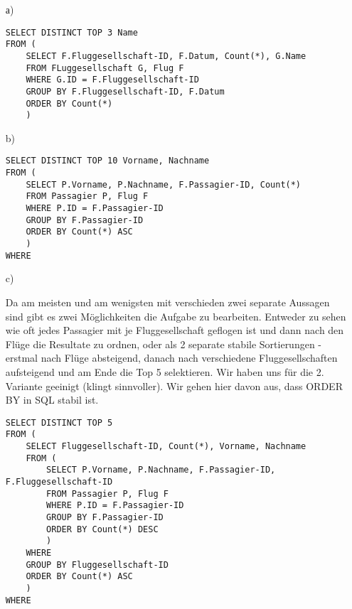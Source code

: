 \begin{itemize}

\item[а)]
\begin{Verbatim}
SELECT DISTINCT TOP 3 Name
FROM (
	SELECT F.Fluggesellschaft-ID, F.Datum, Count(*), G.Name
	FROM FLuggesellschaft G, Flug F
	WHERE G.ID = F.Fluggesellschaft-ID
	GROUP BY F.Fluggesellschaft-ID, F.Datum
	ORDER BY Count(*)
	)
\end{Verbatim}

\item[b)]
\begin{Verbatim}
SELECT DISTINCT TOP 10 Vorname, Nachname
FROM (
	SELECT P.Vorname, P.Nachname, F.Passagier-ID, Count(*)
	FROM Passagier P, Flug F
	WHERE P.ID = F.Passagier-ID
	GROUP BY F.Passagier-ID
	ORDER BY Count(*) ASC
	)
WHERE
\end{Verbatim}

\item[c)]

Da am meisten und am wenigsten mit verschieden zwei separate Aussagen sind gibt es zwei Möglichkeiten die Aufgabe zu bearbeiten. Entweder zu sehen wie oft jedes Passagier mit je Fluggesellschaft geflogen ist und dann nach den Flüge die Resultate zu ordnen, oder als 2 separate stabile Sortierungen - erstmal nach Flüge absteigend, danach nach verschiedene Fluggesellschaften aufsteigend und am Ende die Top 5 selektieren. Wir haben uns für die 2. Variante geeinigt (klingt sinnvoller). Wir gehen hier davon aus, dass ORDER BY in SQL stabil ist.

\begin{Verbatim}
SELECT DISTINCT TOP 5 
FROM (
	SELECT Fluggesellschaft-ID, Count(*), Vorname, Nachname
	FROM (
		SELECT P.Vorname, P.Nachname, F.Passagier-ID, F.Fluggesellschaft-ID
		FROM Passagier P, Flug F
		WHERE P.ID = F.Passagier-ID
		GROUP BY F.Passagier-ID
		ORDER BY Count(*) DESC
		)
	WHERE
	GROUP BY Fluggesellschaft-ID
	ORDER BY Count(*) ASC
	)
WHERE
\end{Verbatim}


\end{itemize}



